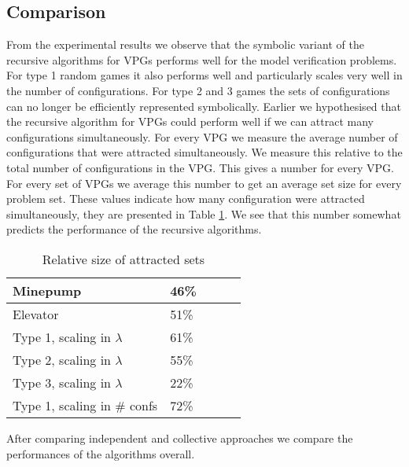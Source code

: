 \subsection{Comparison}
From the experimental results we observe that the symbolic variant of the recursive algorithms for VPGs performs well for the model verification problems. For type 1 random games it also performs well and particularly scales very well in the number of configurations. For type 2 and 3 games the sets of configurations can no longer be efficiently represented symbolically. Earlier we hypothesised that the recursive algorithm for VPGs could perform well if we can attract many configurations simultaneously. For every VPG we measure the average number of configurations that were attracted simultaneously. We measure this relative to the total number of configurations in the VPG. This gives a number for every VPG. For every set of VPGs we average this number to get an average set size for every problem set. These values indicate how many configuration were attracted simultaneously, they are presented in Table \ref{tab_attracted_set_size}. We see that this number somewhat predicts the performance of the recursive algorithms.

\begin{table}[h]
	\centering
	\begin{tabular}{|l|l|l|l|l|}
		\hline
		Minepump& 46\%\\ \hline
		Elevator& 51\%\\ \hline
		Type 1, scaling in $\lambda$& 61\%\\ \hline
		Type 2, scaling in $\lambda$& 55\%\\ \hline
		Type 3, scaling in $\lambda$& 22\%\\ \hline
		Type 1, scaling in \# confs& 72\%\\ \hline
	\end{tabular}
	\caption{Relative size of attracted sets}
	\label{tab_attracted_set_size}
\end{table}

After comparing independent and collective approaches we compare the performances of the algorithms overall.


